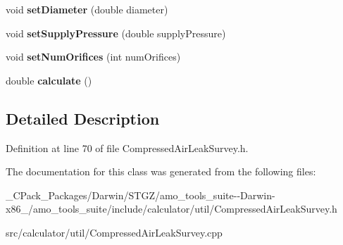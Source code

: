 \begin{DoxyCompactItemize}
void {\bfseries set\+Diameter} (double diameter)
\item 
\mbox{\label{class_orifice_method_data_a16a3ab8726b1a83679a8f1517d16a243}} 
void {\bfseries set\+Supply\+Pressure} (double supply\+Pressure)
\item 
\mbox{\label{class_orifice_method_data_a684f185fcd923e6128faa3a442964e64}} 
void {\bfseries set\+Num\+Orifices} (int num\+Orifices)
\item 
\mbox{\label{class_orifice_method_data_a98e7e2a358d23a8f264590c087c6db94}} 
double {\bfseries calculate} ()
\end{DoxyCompactItemize}


\subsection{Detailed Description}


Definition at line 70 of file Compressed\+Air\+Leak\+Survey.\+h.



The documentation for this class was generated from the following files\+:\begin{DoxyCompactItemize}
\item 
\+\_\+\+C\+Pack\+\_\+\+Packages/\+Darwin/\+S\+T\+G\+Z/amo\+\_\+tools\+\_\+suite-\/-\/\+Darwin-\/x86\+\_/amo\+\_\+tools\+\_\+suite/include/calculator/util/Compressed\+Air\+Leak\+Survey.\+h\item 
src/calculator/util/Compressed\+Air\+Leak\+Survey.\+cpp\end{DoxyCompactItemize}
